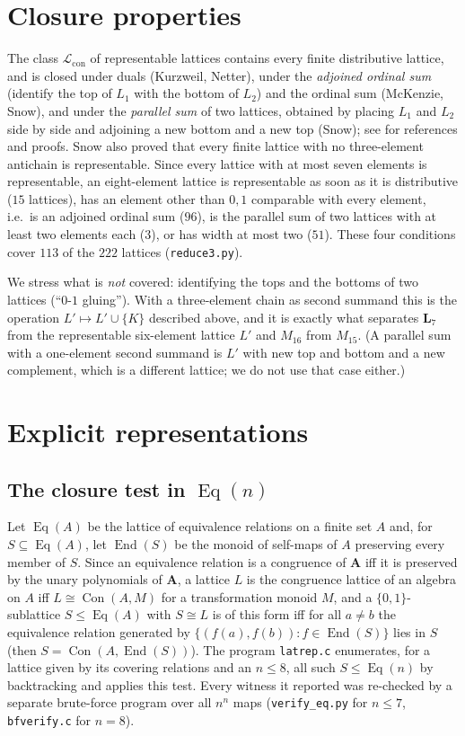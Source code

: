 \documentclass[11pt]{article}
\theoremstyle{remark}
\newcommand{\Con}{\operatorname{Con}}
\newcommand{\Eq}{\operatorname{Eq}}
\newcommand{\End}{\operatorname{End}}
\newcommand{\LL}{\mathbf{L}_7}
\newcommand{\Lcon}{\mathcal L_{\mathrm{con}}}
\begin{document}
\section{Closure properties}\label{sec:formal}

The class $\Lcon$ of representable lattices contains every finite distributive lattice, and is
closed under duals (Kurzweil, Netter), under the \emph{adjoined ordinal sum} (identify the top of
$L_1$ with the bottom of $L_2$) and the ordinal sum (McKenzie, Snow), and under the \emph{parallel
sum} of two lattices, obtained by placing $L_1$ and $L_2$ side by side and adjoining a new bottom
and a new top (Snow); see \cite[\S 3]{DeMeoFreese} for references and proofs. Snow \cite{Snow2000}
also proved that every finite lattice with no three-element antichain is representable.
Since every lattice with at most seven elements is representable, an eight-element lattice is
representable as soon as it is distributive ($15$ lattices), has an element other than $0,1$
comparable with every element, i.e.\ is an adjoined ordinal sum ($96$), is the parallel sum of two
lattices with at least two elements each ($3$), or has width at most two ($51$). These four
conditions cover $113$ of the $222$ lattices (\texttt{reduce3.py}).

We stress what is \emph{not} covered: identifying the tops and the bottoms of two lattices
(``$0$-$1$ gluing''). With a three-element chain as second summand this is the operation
$L'\mapsto L'\cup\{K\}$ described above, and it is exactly what separates $\LL$ from the
representable six-element lattice $L'$ and $M_{16}$ from $M_{15}$. (A parallel sum with a
one-element second summand is $L'$ with new top and bottom and a new complement, which is a
different lattice; we do not use that case either.)

\section{Explicit representations}\label{sec:wit}

\subsection{The closure test in $\Eq(n)$}
Let $\Eq(A)$ be the lattice of equivalence relations on a finite set $A$ and, for $S\subseteq\Eq(A)$,
let $\End(S)$ be the monoid of self-maps of $A$ preserving every member of $S$. Since an equivalence
relation is a congruence of $\mathbf A$ iff it is preserved by the unary polynomials of $\mathbf A$,
a lattice $L$ is the congruence lattice of an algebra on $A$ iff $L\cong\Con(A,M)$ for a
transformation monoid $M$, and a $\{0,1\}$-sublattice $S\le\Eq(A)$ with $S\cong L$ is of this form
iff for all $a\ne b$ the equivalence relation generated by $\{(f(a),f(b)):f\in\End(S)\}$ lies in
$S$ (then $S=\Con(A,\End(S))$). The program \texttt{latrep.c} enumerates, for a lattice given by its
covering relations and an $n\le 8$, all such $S\le\Eq(n)$ by backtracking and applies this test.
Every witness it reported was re-checked by a separate brute-force program over all $n^n$ maps
(\texttt{verify\_eq.py} for $n\le 7$, \texttt{bfverify.c} for $n=8$).
\end{document}
